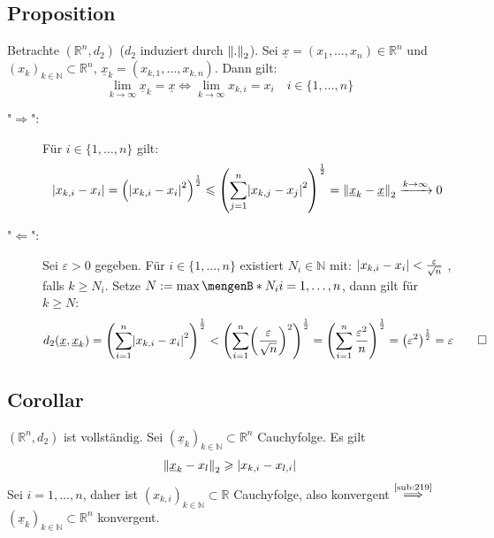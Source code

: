 \subsection[Proposition über Konvergenz von Vektoren]{Proposition} %
\label{sub:219}
Betrachte $(\mathds{R}^n, d_2)$ ($d_2$ induziert durch $\norm[2]{.} $). Sei $\underline{x}= (x_1, \ldots , x_n) \in \mathds{R}^n$ und 
$(x_k)_{k \in \mathds{N}} \subset \mathds{R}^n$, $\underline{x}_k = (x_{k,1}, \ldots , x_{k,n})$. Dann gilt: 
\[
	\lim\limits_{ k \to \infty}  \underline{x}_k = \underline{x} \iff \lim\limits_{ k \to \infty} x_{k,i} = x_i \quad i \in \{1, \ldots , n\}
\]
\begin{description}
	\item["$\Rightarrow$":] Für $i \in \{1, \ldots , n\}$ gilt:
	\begin{align*}
		\abs*{x_{k,i} - x_i} = \enbrace*{\abs*{x_{k,i} -  x_i}^2 }^{\frac{1}{2}} \le \enbrace*{\sum_{j=1}^{n} \abs*{x_{k,j} - x_j}^2 }^{\frac{1}{2} }  
		= \norm[2]{\underline{x}_k - \underline{x}  } \xrightarrow{k \to \infty} 0 
	\end{align*}
	\item["$\Leftarrow$":] Sei $\varepsilon >0$ gegeben. Für $i \in \{1, \ldots , n\}$ existiert $N_i \in \mathds{N}$ mit: 
	$\abs*{x_{k,i} - x_i} < \frac{\varepsilon}{\sqrt{n}}  $ , falls $k \ge N_i$. Setze $N:= \max \set[N_i]{i=1, \ldots , n}$, dann gilt für $k \ge N$:
	\begin{align*}
		d_2(\underline{x} , \underline{x}_k)= \enbrace*{ \sum_{i=1}^{n}  \abs*{x_{k,i} - x_i}^2 }^{\frac{1}{2} } < \enbrace*{ \sum_{i=1}^{n} 
		 \enbrace*{\frac{\varepsilon}{\sqrt{n} } }^2 }^{\frac{1}{2} } = \enbrace*{ \sum_{i=1}^{n}  \frac{\varepsilon^2}{n} }^{\frac{1}{2} } = 
		 \enbrace*{\varepsilon^2}^{\frac{1}{2}} = \varepsilon \tag*{$\square$} 
	\end{align*}
\end{description}

\subsection[Corollar: $(\mathds{R}^n, d_2)$ ist vollständig]{Corollar} %
\label{sub:220}
$(\mathds{R}^n, d_2)$ ist vollständig.
Sei $(\underline{x}_k)_{k \in \mathds{N}} \subset \mathds{R}^n$ Cauchyfolge. Es gilt
\[
	\norm[2]{\underline{x}_k - x_l } \ge \abs*{x_{k,i} - x_{l,i}}  
\]
Sei $i= 1, \ldots , n$, daher ist $(x_{k,i})_{k \in \mathds{N}} \subset \mathds{R}$ Cauchyfolge, also konvergent $\overset{\text{\ref{sub:219}}}{\Longrightarrow}$
$(\underline{x}_k)_{k \in \mathds{N}} \subset \mathds{R}^n$ konvergent. \bewende
\newpage

